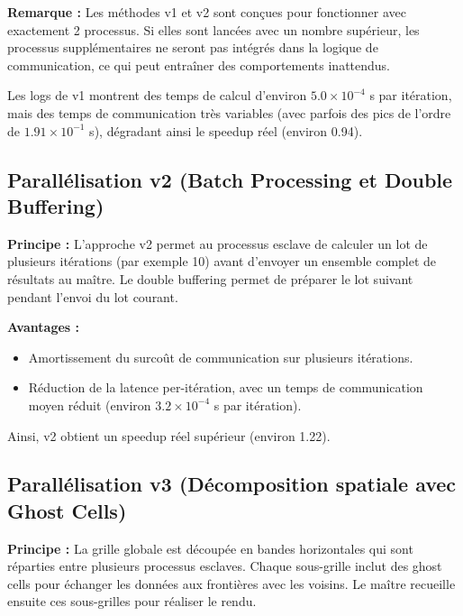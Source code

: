 \documentclass[a4paper,13pt]{book}
\begin{document}
\textbf{Remarque :}  
Les méthodes v1 et v2 sont conçues pour fonctionner avec exactement 2 processus. Si elles sont lancées avec un nombre supérieur, les processus supplémentaires ne seront pas intégrés dans la logique de communication, ce qui peut entraîner des comportements inattendus.
\medskip

Les logs de v1 montrent des temps de calcul d'environ \(5.0\times10^{-4}\) s par itération, mais des temps de communication très variables (avec parfois des pics de l'ordre de \(1.91\times10^{-1}\) s), dégradant ainsi le speedup réel (environ 0.94).

\subsection{Parallélisation v2 (Batch Processing et Double Buffering)}
\textbf{Principe :}  
L'approche v2 permet au processus esclave de calculer un lot de plusieurs itérations (par exemple 10) avant d'envoyer un ensemble complet de résultats au maître. Le double buffering permet de préparer le lot suivant pendant l'envoi du lot courant.
\medskip

\textbf{Avantages :}
\begin{itemize}
    \item Amortissement du surcoût de communication sur plusieurs itérations.
    \item Réduction de la latence per-itération, avec un temps de communication moyen réduit (environ \(3.2\times10^{-4}\) s par itération).
\end{itemize}
Ainsi, v2 obtient un speedup réel supérieur (environ 1.22).

\subsection{Parallélisation v3 (Décomposition spatiale avec Ghost Cells)}
\textbf{Principe :}  
La grille globale est découpée en bandes horizontales qui sont réparties entre plusieurs processus esclaves. Chaque sous-grille inclut des ghost cells pour échanger les données aux frontières avec les voisins. Le maître recueille ensuite ces sous-grilles pour réaliser le rendu.
\medskip
\end{document}
